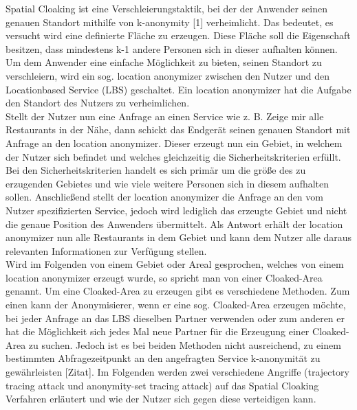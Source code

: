 Spatial Cloaking ist eine Verschleierungstaktik, bei der der Anwender seinen genauen Standort mithilfe von k-anonymity [1] verheimlicht. Das bedeutet, es versucht wird eine definierte Fläche zu erzeugen. Diese Fläche soll die Eigenschaft besitzen, dass mindestens k-1 andere Personen sich in dieser aufhalten können. Um dem Anwender eine einfache Möglichkeit zu bieten, seinen Standort zu verschleiern, wird ein sog. location anonymizer zwischen den Nutzer und den Locationbased Service (LBS) geschaltet. Ein location anonymizer hat die Aufgabe den Standort des Nutzers zu verheimlichen. \\ Stellt der Nutzer nun eine Anfrage an einen Service wie z. B. \glqq Zeige mir alle Restaurants in der Nähe\grqq, dann schickt das Endgerät seinen genauen Standort mit Anfrage an den location anonymizer. Dieser erzeugt nun ein Gebiet, in welchem der Nutzer sich befindet und welches gleichzeitig die Sicherheitskriterien erfüllt. Bei den Sicherheitskriterien handelt es sich primär um die größe des zu erzugenden Gebietes und wie viele weitere Personen sich in diesem aufhalten sollen. Anschließend stellt der location anonymizer die Anfrage an den vom Nutzer spezifizierten Service, jedoch wird lediglich das erzeugte Gebiet und nicht die genaue Position des Anwenders übermittelt. Als Antwort erhält der location anonymizer nun alle Restaurants in dem Gebiet und kann dem Nutzer alle daraus relevanten Informationen zur Verfügung stellen.\\ Wird im Folgenden von einem Gebiet oder Areal gesprochen, welches von einem location anonymizer erzeugt wurde, so spricht man von einer Cloaked-Area genannt. Um eine Cloaked-Area zu erzeugen gibt es verschiedene Methoden. Zum einen kann der Anonymisierer, wenn er eine sog. Cloaked-Area erzeugen möchte, bei jeder Anfrage an das LBS dieselben Partner verwenden oder zum anderen er hat die Möglichkeit sich jedes Mal neue Partner für die Erzeugung einer Cloaked-Area zu suchen. Jedoch ist es bei beiden Methoden nicht ausreichend, zu einem bestimmten Abfragezeitpunkt an den angefragten Service k-anonymität zu gewährleisten [Zitat]. Im Folgenden werden zwei verschiedene Angriffe (trajectory tracing attack und anonymity-set tracing attack) auf das Spatial Cloaking Verfahren erläutert und wie der Nutzer sich gegen diese verteidigen kann. 
